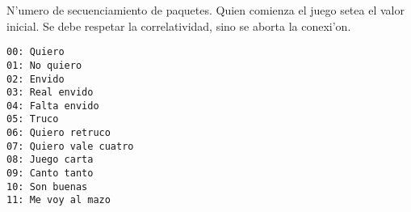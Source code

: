 
N'umero de secuenciamiento de paquetes. Quien comienza el juego setea el valor inicial. Se debe respetar la correlatividad, sino se aborta la conexi'on.


\begin{verbatim}
00: Quiero
01: No quiero
02: Envido
03: Real envido
04: Falta envido
05: Truco
06: Quiero retruco
07: Quiero vale cuatro
08: Juego carta
09: Canto tanto
10: Son buenas
11: Me voy al mazo
\end{verbatim}
